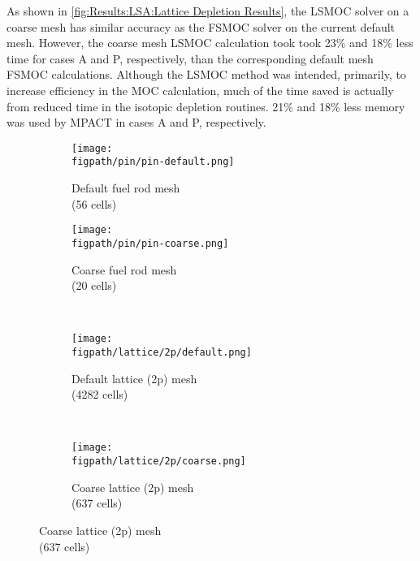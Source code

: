{{{            As shown in \cref{fig:Results:LSA:Lattice Depletion Results}, the \ac{LSMOC} solver on a coarse mesh has similar accuracy as the \ac{FSMOC} solver on the current default mesh.
            However, the coarse mesh \ac{LSMOC} calculation took took 23\% and 18\% less time for cases A and P, respectively, than the corresponding default mesh \ac{FSMOC} calculations.
            Although the \ac{LSMOC} method was intended, primarily, to increase efficiency in the \ac{MOC} calculation, much of the time saved is actually from reduced time in the isotopic depletion routines.
            21\% and 18\% less memory was used by MPACT in cases A and P, respectively.
            \begin{figure}[h]
                \centering
                \begin{minipage}{0.25\linewidth}
                    \centering
                    \begin{subfigure}[t]{\linewidth}
                        \centering
                        \texttt{[image: \\figpath/pin/pin-default.png]}
                        \caption{Default fuel rod mesh\\\centering(56 cells)}
                    \end{subfigure}
                    \begin{subfigure}[t]{\linewidth}
                        \centering
                        \texttt{[image: \\figpath/pin/pin-coarse.png]}
                        \caption{Coarse fuel rod mesh\\\centering(20 cells)}
                    \end{subfigure}
                \end{minipage}%
                ~
                \begin{minipage}{0.75\linewidth}
                    \centering
                    \begin{subfigure}[t]{0.40\linewidth}
                        \centering
                        \texttt{[image: \\figpath/lattice/2p/default.png]}
                        \caption{Default lattice (2p) mesh\\\centering(4282 cells)}
                    \end{subfigure}%
                    ~
                    \begin{subfigure}[t]{0.40\linewidth}
                        \centering
                        \texttt{[image: \\figpath/lattice/2p/coarse.png]}
                        \caption{Coarse lattice (2p) mesh\\\centering(637 cells)}

\end{subfigure}
\end{minipage}
\end{figure}}}}
